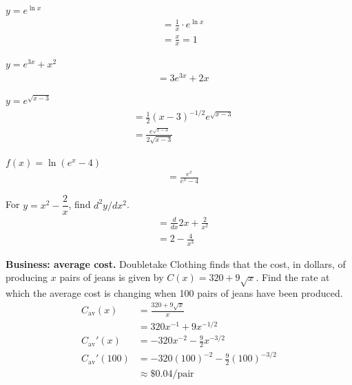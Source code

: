 \documentclass[12pt]{article}
\newenvironment{problem}[2][]{
    \begin{trivlist}
        \item[
            {\bfseries #1}
            {\bfseries #2.}
        ]
}{\end{trivlist}}
\begin{document}
\begin{problem}{17}
    $y = e^{\ln x}$
    \begin{align}
        &= \frac{1}{x} \cdot e^{\ln x} \\
        &= \frac{x}{x} = 1
    \end{align}
\end{problem}

\begin{problem}{18}
    $y = e^{3x} + x^2$
    \begin{align}
        &= 3e^{3x} + 2x
    \end{align}
\end{problem}

\begin{problem}{19}
    $y = e^{\sqrt{x - 3}}$
    \begin{align}
        &= \frac{1}{2} \left(x - 3\right)^{-1/2} e^{\sqrt{x - 3}} \\
        &= \frac{e^{\sqrt{x - 3}}}{2 \sqrt{x - 3}}
    \end{align}
\end{problem}

\begin{problem}{20}
    $f(x) = \ln \left(e^x - 4\right)$
    \begin{align}
        &= \frac{e^x}{e^x - 4}
    \end{align}
\end{problem}

\begin{problem}{21}
    For $y = x^2 - \dfrac{2}{x}$, find $d^2 y / dx^2$.
    \begin{align}
        &= \frac{d}{dx} 2x + \frac{2}{x^2} \\
        &= 2 - \frac{4}{x^3}
    \end{align}
\end{problem}

\begin{problem}{22}
    \textbf{Business: average cost.}
    Doubletake Clothing finds that the cost, in dollars, of producing $x$ pairs of jeans is given by $C(x) = 320 + 9\sqrt{x}$.
    Find the rate at which the average cost is changing when 100 pairs of jeans have been produced.
    \begin{align}
        C_{\text{av}}(x) &= \frac{320 + 9\sqrt{x}}{x} \\
        &= 320x^{-1} + 9x^{-1/2} \\
        {C_{\text{av}}}'(x) &= -320x^{-2} - \frac{9}{2} x^{-3/2} \\
        {C_{\text{av}}}'(100) &= -320\left(100\right)^{-2} - \frac{9}{2} \left(100\right)^{-3/2} \\
        &\approx \$0.04/\text{pair}
    \end{align}
\end{problem}
\end{document}
